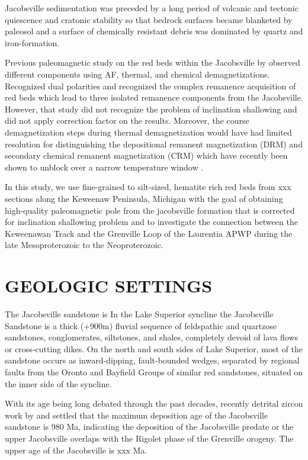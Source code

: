 \documentclass[11pt,letterpaper]{article}
\begin{document}
Jacobsville sedimentation was preceded by a long period of volcanic and tectonic quiescence and cratonic stability so that bedrock surfaces became blanketed by paleosol and a surface of chemically resistant debris was dominated by quartz and iron-formation. 

Previous paleomagnetic study on the red beds within the Jacobsville by \cite{Roy1978a} observed different components using AF, thermal, and chemical demagnetizations. Recognized dual polarities and recognized the complex remanence acquisition of red beds which lead to three isolated remanence components from the Jacobsville. However, that study did not recognize the problem of inclination shallowing and did not apply correction factor on the results. Moreover, the course demagnetization steps during thermal demagnetization would have had limited resolution for distinguishing the depositional remanent magnetization (DRM) and secondary chemical remanent magnetization (CRM) which have recently been shown to unblock over a narrow temperature window \cite{Swanson-Hysell2019b}. 

In this study, we use fine-grained to silt-sized, hematite rich red beds from xxx sections along the Keweenaw Peninsula, Michigan with the goal of obtaining high-quality paleomagnetic pole from the jacobsville formation that is corrected for inclination shallowing problem and to investigate the connection between the Keweenawan Track and the Grenville Loop of the Laurentia APWP during the late Mesoproterozoic to the Neoproterozoic. 

\section*{GEOLOGIC SETTINGS}


The Jacobsville sandstone is 
\cite{Kalliokoski1982a} In the Lake Superior syncline the Jacobsville Sandstone is a thick (+900m) fluvial sequence of feldspathic and quartzose sandstones, conglomerates, siltstones, and shales, completely devoid of lava flows or cross-cutting dikes. On the north and south sides of Lake Superior, most of the sandstone occurs as inward-dipping, fault-bounded wedges, separated by regional faults from the Oronto and Bayfield Groups of similar red sandstones, situated on the inner side of the syncline. 

With its age being long debated through the past decades, recently detrital zircon work by \cite{Malone2016a} and  settled that the maximum deposition age of the Jacobsville sandstone  is 980 Ma, indicating the deposition of the Jacobsville predate or the upper Jacobsville overlaps with the Rigolet phase of the Grenville orogeny. The upper age of the Jacobsville is xxx Ma.
\end{document}
